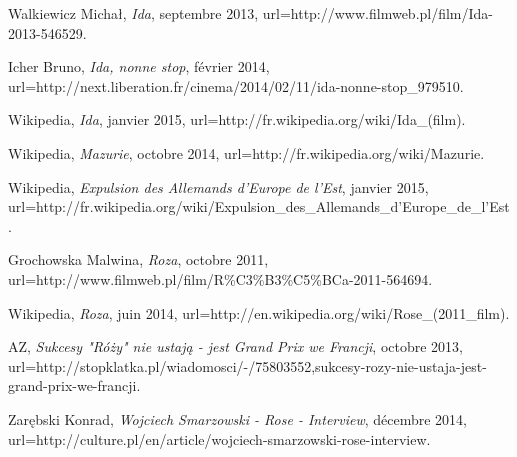 \documentclass[12pt]{amsart}
\begin{document}
\begin{thebibliography}{100}
	Walkiewicz Michał,
	\emph{Ida},
	septembre 2013,
	url=http://www.filmweb.pl/film/Ida-2013-546529.

	Icher Bruno,
	\emph{Ida, nonne stop},
	février 2014,
	url=http://next.liberation.fr/cinema/2014/02/11/ida-nonne-stop\_979510.

	Wikipedia,
	\emph{Ida},
	janvier 2015,
	url=http://fr.wikipedia.org/wiki/Ida\_(film).

	Wikipedia,
	\emph{Mazurie},
	octobre 2014,
	url=http://fr.wikipedia.org/wiki/Mazurie.

	Wikipedia,
	\emph{Expulsion des Allemands d'Europe de l'Est},
	janvier 2015,
	url=http://fr.wikipedia.org/wiki/Expulsion\_des\_Allemands\_d'Europe\_de\_l'Est.

	Grochowska Malwina,
	\emph{Roza},
	octobre 2011,
	url=http://www.filmweb.pl/film/R\%C3\%B3\%C5\%BCa-2011-564694.

	Wikipedia,
	\emph{Roza},
	juin 2014,
	url=http://en.wikipedia.org/wiki/Rose\_(2011\_film).

	AZ,
	\emph{Sukcesy "Róży" nie ustają - jest Grand Prix we Francji},
	octobre 2013,
	url=http://stopklatka.pl/wiadomosci/-/75803552,sukcesy-rozy-nie-ustaja-jest-grand-prix-we-francji.

	Zarębski Konrad,
	\emph{Wojciech Smarzowski - Rose - Interview},
	décembre 2014,
	url=http://culture.pl/en/article/wojciech-smarzowski-rose-interview.

\end{thebibliography}
\end{document}
